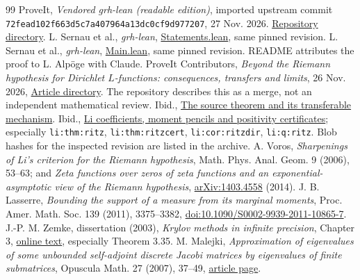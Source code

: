 \documentclass[11pt]{article}
\theoremstyle{remark}\newtheorem{remark}[theorem]{Remark}
\begin{document}
\begin{thebibliography}{99}
 ProveIt, \emph{Vendored grh-lean (readable edition)}, imported upstream commit \texttt{72fead102f663d5c7a407964a13dc0cf9d977207}, 27 Nov. 2026. \href{https://github.com/VladimirReshetnikov/ProveIt/tree/main/Analysis/GeneralizedRiemannHypothesis/vendor/grh-lean}{Repository directory}.
 L. Sernau et al., \emph{grh-lean}, \href{https://github.com/lsernau/grh-lean/blob/72fead102f663d5c7a407964a13dc0cf9d977207/grh/src/Statements.lean}{Statements.lean}, same pinned revision.
 L. Sernau et al., \emph{grh-lean}, \href{https://github.com/lsernau/grh-lean/blob/72fead102f663d5c7a407964a13dc0cf9d977207/grh/src/Main.lean}{Main.lean}, same pinned revision. README attributes the proof to L. Alp\"oge with Claude.
 ProveIt Contributors, \emph{Beyond the Riemann hypothesis for Dirichlet $L$-functions: consequences, transfers and limits}, 26 Nov. 2026, \href{https://github.com/VladimirReshetnikov/ProveIt/tree/main/Analysis/GeneralizedRiemannHypothesis/Article}{Article directory}. The repository describes this as a merge, not an independent mathematical review.
 Ibid., \href{https://github.com/VladimirReshetnikov/ProveIt/blob/main/Analysis/GeneralizedRiemannHypothesis/Article/sections/src.tex}{The source theorem and its transferable mechanism}.
 Ibid., \href{https://github.com/VladimirReshetnikov/ProveIt/blob/main/Analysis/GeneralizedRiemannHypothesis/Article/sections/li.tex}{Li coefficients, moment pencils and positivity certificates}; especially \texttt{li:thm:ritz}, \texttt{li:thm:ritzcert}, \texttt{li:cor:ritzdir}, \texttt{li:q:ritz}. Blob hashes for the inspected revision are listed in the archive.
 A. Voros, \emph{Sharpenings of Li's criterion for the Riemann hypothesis}, Math. Phys. Anal. Geom. 9 (2006), 53--63; and \emph{Zeta functions over zeros of zeta functions and an exponential-asymptotic view of the Riemann hypothesis}, \href{https://arxiv.org/abs/1403.4558}{arXiv:1403.4558} (2014).
 J. B. Lasserre, \emph{Bounding the support of a measure from its marginal moments}, Proc. Amer. Math. Soc. 139 (2011), 3375--3382, \href{https://doi.org/10.1090/S0002-9939-2011-10865-7}{doi:10.1090/S0002-9939-2011-10865-7}.
 J.-P. M. Zemke, dissertation (2003), \emph{Krylov methods in infinite precision}, Chapter 3, \href{https://webdoc.sub.gwdg.de/ebook/dissts/Hamburg/Zemke2003.pdf}{online text}, especially Theorem 3.35.
 M. Malejki, \emph{Approximation of eigenvalues of some unbounded self-adjoint discrete Jacobi matrices by eigenvalues of finite submatrices}, Opuscula Math. 27 (2007), 37--49, \href{https://www.opuscula.agh.edu.pl/om-vol27iss1art4}{article page}.
\end{thebibliography}
\end{document}
